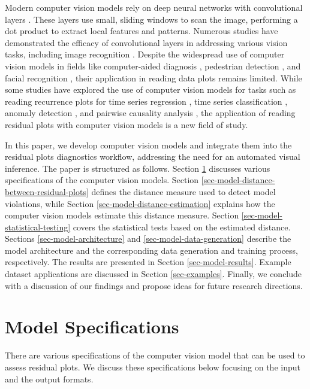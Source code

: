 \documentclass[]{interact}
\theoremstyle{plain}%
\theoremstyle{definition}
\theoremstyle{remark}
\begin{document}
Modern computer vision models rely on deep neural networks with
convolutional layers \citep{fukushima1982neocognitron}. These layers use
small, sliding windows to scan the image, performing a dot product to
extract local features and patterns. Numerous studies have demonstrated
the efficacy of convolutional layers in addressing various vision tasks,
including image recognition \citep{rawat2017deep}. Despite the
widespread use of computer vision models in fields like computer-aided
diagnosis \citep{lee2015image}, pedestrian detection
\citep{brunetti2018computer}, and facial recognition
\citep{emami2012facial}, their application in reading data plots remains
limited. While some studies have explored the use of computer vision
models for tasks such as reading recurrence plots for time series
regression \citep{ojeda2020multivariate}, time series classification
\citep{chu2019automatic, hailesilassie2019financial, hatami2018classification, zhang2020encoding},
anomaly detection \citep{chen2020convolutional}, and pairwise causality
analysis \citep{singh2017deep}, the application of reading residual
plots with computer vision models is a new field of study.

In this paper, we develop computer vision models and integrate them into
the residual plots diagnostics workflow, addressing the need for an
automated visual inference. The paper is structured as follows. Section
\ref{sec-model-specifications} discusses various specifications of the
computer vision models. Section
\ref{sec-model-distance-between-residual-plots} defines the distance
measure used to detect model violations, while Section
\ref{sec-model-distance-estimation} explains how the computer vision
models estimate this distance measure. Section
\ref{sec-model-statistical-testing} covers the statistical tests based
on the estimated distance. Sections \ref{sec-model-architecture} and
\ref{sec-model-data-generation} describe the model architecture and the
corresponding data generation and training process, respectively. The
results are presented in Section \ref{sec-model-results}. Example
dataset applications are discussed in Section \ref{sec-examples}.
Finally, we conclude with a discussion of our findings and propose ideas
for future research directions.

\section{Model Specifications}\label{sec-model-specifications}

There are various specifications of the computer vision model that can
be used to assess residual plots. We discuss these specifications below
focusing on the input and the output formats.
\end{document}
